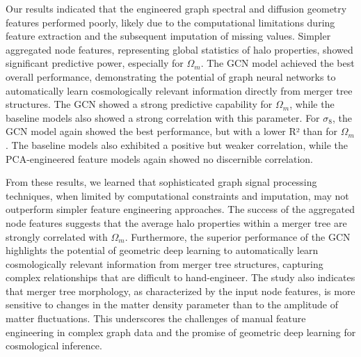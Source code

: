 \documentclass[twocolumn]{aastex631}
\begin{document}
Our results indicated that the engineered graph spectral and diffusion geometry features performed poorly, likely due to the computational limitations during feature extraction and the subsequent imputation of missing values. Simpler aggregated node features, representing global statistics of halo properties, showed significant predictive power, especially for $\Omega_m$. The GCN model achieved the best overall performance, demonstrating the potential of graph neural networks to automatically learn cosmologically relevant information directly from merger tree structures. The GCN showed a strong predictive capability for $\Omega_m$, while the baseline models also showed a strong correlation with this parameter. For $\sigma_8$, the GCN model again showed the best performance, but with a lower R² than for $\Omega_m$. The baseline models also exhibited a positive but weaker correlation, while the PCA-engineered feature models again showed no discernible correlation.

From these results, we learned that sophisticated graph signal processing techniques, when limited by computational constraints and imputation, may not outperform simpler feature engineering approaches. The success of the aggregated node features suggests that the average halo properties within a merger tree are strongly correlated with $\Omega_m$. Furthermore, the superior performance of the GCN highlights the potential of geometric deep learning to automatically learn cosmologically relevant information from merger tree structures, capturing complex relationships that are difficult to hand-engineer. The study also indicates that merger tree morphology, as characterized by the input node features, is more sensitive to changes in the matter density parameter than to the amplitude of matter fluctuations. This underscores the challenges of manual feature engineering in complex graph data and the promise of geometric deep learning for cosmological inference.

{}

\end{document}
